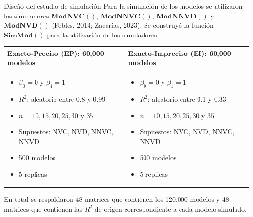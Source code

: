 \documentclass[serif, aspectratio=169]{beamer}
\begin{document}
\begin{frame}{Diseño del estudio de simulación}
Para la simulación de los modelos se utilizaron los simuladores $\mathbf{ModNVC()}$, $\mathbf{ModNNVC()}$, $\mathbf{ModNNVD()}$ y $\mathbf{ModNVD()}$ (Febles, 2014; Zacarías, 2023). Se construyó la función $\mathbf{SimMod()}$ para la utilización de los simuladores.
\vspace{.3cm}

		
		\begin{table}[h!]
			\renewcommand{\arraystretch}{0.9} %
			\scriptsize %
			\begin{tabular}{|p{5cm}|p{5cm}|} %
				\hline
				\textbf{Exacto-Preciso (EP): 60,000 modelos} & \textbf{Exacto-Impreciso (EI): 60,000 modelos} \\ \hline
				
				
				\begin{itemize}
					\item $\beta_0 = 0$ y $\beta_1 = 1$
					\item $R^2$: aleatorio entre 0.8 y 0.99
					\item $n = 10, 15, 20, 25, 30$ y $35$
					\item Supuestos: NVC, NVD, NNVC, NNVD
					\item 500 modelos
					\item 5 replicas
				\end{itemize}
				 &
				  	
				 \begin{itemize}
				 	\item $\beta_0 = 0$ y $\beta_1 = 1$
				 	\item $R^2$: aleatorio entre 0.1 y 0.33
				 	\item $n = 10, 15, 20, 25, 30$ y $35$
				 	\item Supuestos: NVC, NVD, NNVC, NNVD
				 	\item 500 modelos
				 	\item 5 replicas
				 \end{itemize}
				 
				 \\ \hline
			\end{tabular}
		\end{table}
		
		
		En total se respaldaron 48 matrices que contienen los 120,000 modelos y 48 matrices que contienen las $R^2$ de origen correspondiente a cada modelo simulado.
		
\end{frame}
\end{document}
